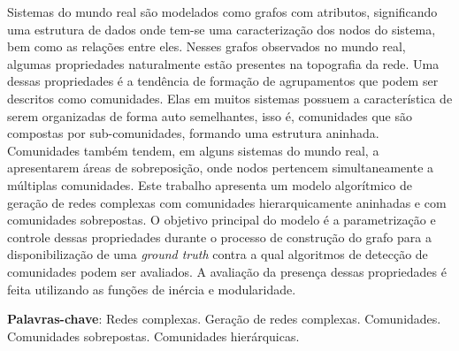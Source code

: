 \documentclass[notes.tex]{subfiles}
\begin{document}
\DoubleSpacing
\begin{resumoumacoluna}
\bigskip

Sistemas do mundo real são modelados como grafos com atributos, significando uma estrutura de dados onde tem-se uma caracterização dos nodos do sistema, bem como as relações entre eles.
Nesses grafos observados no mundo real, algumas propriedades naturalmente estão presentes na topografia da rede.
Uma dessas propriedades é a tendência de formação de agrupamentos que podem ser descritos como comunidades.
Elas em muitos sistemas possuem a característica de serem organizadas de forma auto semelhantes, isso é, comunidades que são compostas por sub-comunidades, formando uma estrutura aninhada.
Comunidades também tendem, em alguns sistemas do mundo real, a apresentarem áreas de sobreposição, onde nodos pertencem simultaneamente a múltiplas comunidades.
Este trabalho apresenta um modelo algorítmico de geração de redes complexas com comunidades hierarquicamente aninhadas e com comunidades sobrepostas.
O objetivo principal do modelo é a parametrização e controle dessas propriedades durante o processo de construção do grafo para a disponibilização de uma \emph{ground truth} contra a qual algoritmos de detecção de comunidades podem ser avaliados.
A avaliação da presença dessas propriedades é feita utilizando as funções de inércia e modularidade.

 \vspace{\onelineskip}

 \noindent
 \textbf{Palavras-chave}: Redes complexas. Geração de redes complexas. Comunidades. Comunidades sobrepostas. Comunidades hierárquicas.
\end{resumoumacoluna}
\end{document}
